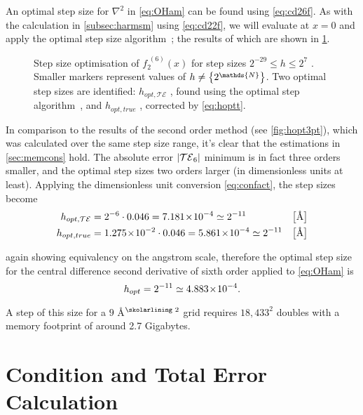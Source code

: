 An optimal step size for $\nabla^2$ in \cref{eq:OHam} can be found using  \cref{eq:cd26f}.
As with the calculation in \cref{subsec:harmsm} using \cref{eq:cd22f}, we will evaluate at $x = 0$ and apply the optimal step size algorithm~\cite{Mathur2012}; the results of which are shown in \cref{fig:hopt7pt}.
\begin{figure}[htp]
\centering
\resizebox{\columnwidth}{!}{}
\caption[Step size optimisation of $f_2^{\;(6)}(x)$]{\label{fig:hopt7pt}Step size optimisation of $f_2^{\;(6)}(x)$ for step sizes $2^{-29}\!\leq\! h\! \leq\! 2^7$ . Smaller markers  represent values of $\cramped{h \neq \left\{2^\mathds{N}\right\}}$. Two optimal step sizes are identified: $h_{opt,\mathcal{TE}}$ , found using the optimal step algorithm~\cite{Mathur2012}, and $h_{opt,true}$ , corrected by \cref{eq:hoptt}.}
\end{figure}

In comparison to the results of the second order method (see \cref{fig:hopt3pt}), which was calculated over the same step size range, it's clear that the estimations in \cref{sec:memcons} hold.
The absolute error $\left\lvert \mathcal{TE}_6\right\rvert$ minimum is in fact three orders smaller, and the optimal step sizes two orders larger (in dimensionless units at least).
Applying the dimensionless unit conversion \cref{eq:confact}, the step sizes become
\begin{align}
h_{opt,\mathcal{TE}} &= 2^{-6}\cdot0.046 = 7.181\!\times\!10^{-4} \simeq 2^{-11} & \left[\text{Å}\right]\\
h_{opt,true} &= 1.275\!\times\!10^{-2}\cdot0.046 = 5.861\!\times\!10^{-4} \simeq 2^{-11} & \left[\text{Å}\right]
\end{align}

again showing equivalency on the angstrom scale, therefore the optimal step size for the central difference second derivative of sixth order applied to \cref{eq:OHam} is
\begin{equation}
h_{opt} = 2^{-11} \simeq 4.883\!\times\!10^{-4}.
\end{equation}

A step of this size for a $9$ Å$^\text{\skolarlining 2}$ grid requires $18,433^2$ doubles with a memory footprint of around 2.7 Gigabytes.

\section{Condition and Total Error Calculation}

